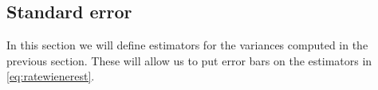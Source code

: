 \documentclass[12pt]{article}
\theoremstyle{slplain}
\theoremstyle{sldefinition}
\theoremstyle{remark}
\begin{document}
\subsection{Standard error}\label{sec:poissonstderr}

In this section we will define estimators for the variances computed in the previous section. These will allow us to put error bars on the estimators in \eqref{eq:ratewienerest}.















\end{document}

